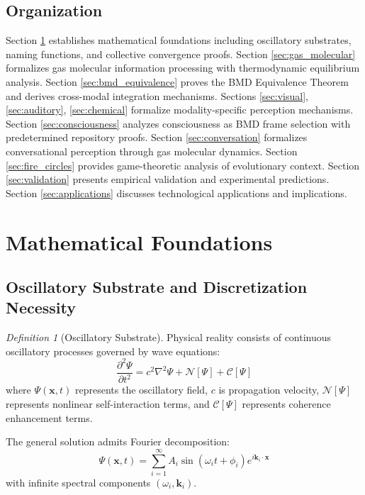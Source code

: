 \documentclass[12pt]{article}
\theoremstyle{definition}
\newtheorem{definition}[theorem]{Definition}
\theoremstyle{remark}
\newtheorem{definition}[theorem]{Definition}
\begin{document}
\subsection{Organization}

Section \ref{sec:foundations} establishes mathematical foundations including oscillatory substrates, naming functions, and collective convergence proofs. Section \ref{sec:gas_molecular} formalizes gas molecular information processing with thermodynamic equilibrium analysis. Section \ref{sec:bmd_equivalence} proves the BMD Equivalence Theorem and derives cross-modal integration mechanisms. Sections \ref{sec:visual}, \ref{sec:auditory}, \ref{sec:chemical} formalize modality-specific perception mechanisms. Section \ref{sec:consciousness} analyzes consciousness as BMD frame selection with predetermined repository proofs. Section \ref{sec:conversation} formalizes conversational perception through gas molecular dynamics. Section \ref{sec:fire_circles} provides game-theoretic analysis of evolutionary context. Section \ref{sec:validation} presents empirical validation and experimental predictions. Section \ref{sec:applications} discusses technological applications and implications.

\section{Mathematical Foundations}
\label{sec:foundations}

\subsection{Oscillatory Substrate and Discretization Necessity}

\begin{definition}[Oscillatory Substrate]
\label{def:oscillatory_substrate}
Physical reality consists of continuous oscillatory processes governed by wave equations:
\begin{equation}
\frac{\partial^2 \Psi}{\partial t^2} = c^2 \nabla^2 \Psi + \mathcal{N}[\Psi] + \mathcal{C}[\Psi]
\end{equation}
where $\Psi(\mathbf{x},t)$ represents the oscillatory field, $c$ is propagation velocity, $\mathcal{N}[\Psi]$ represents nonlinear self-interaction terms, and $\mathcal{C}[\Psi]$ represents coherence enhancement terms.
\end{definition}

The general solution admits Fourier decomposition:
\begin{equation}
\label{eq:fourier_decomposition}
\Psi(\mathbf{x},t) = \sum_{i=1}^{\infty} A_i \sin(\omega_i t + \phi_i) e^{i\mathbf{k}_i \cdot \mathbf{x}}
\end{equation}
with infinite spectral components $(\omega_i, \mathbf{k}_i)$.
\end{document}
